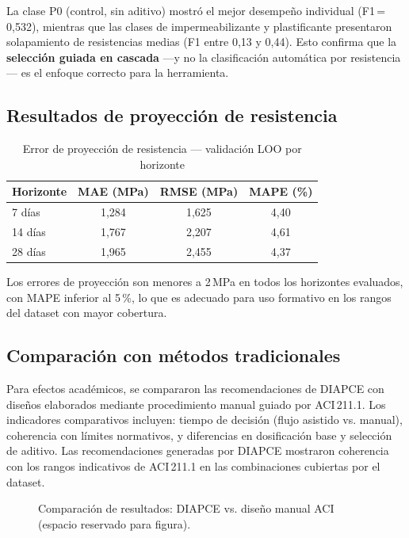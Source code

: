 La clase P0 (control, sin aditivo) mostró el mejor desempeño individual (F1\,=\,0{,}532), mientras que las clases de impermeabilizante y plastificante presentaron solapamiento de resistencias medias (F1 entre 0{,}13 y 0{,}44). Esto confirma que la \textbf{selección guiada en cascada} ---y no la clasificación automática por resistencia--- es el enfoque correcto para la herramienta.

\subsection{Resultados de proyección de resistencia}

\begin{table}[H]
  \centering
  \caption{Error de proyección de resistencia --- validación LOO por horizonte}
  \begin{tabular}{lccc}
    \hline
    Horizonte & MAE (MPa) & RMSE (MPa) & MAPE (\%) \\
    \hline
    7 días  & 1{,}284 & 1{,}625 & 4{,}40 \\
    14 días & 1{,}767 & 2{,}207 & 4{,}61 \\
    28 días & 1{,}965 & 2{,}455 & 4{,}37 \\
    \hline
  \end{tabular}
\end{table}

Los errores de proyección son menores a 2\,MPa en todos los horizontes evaluados, con MAPE inferior al 5\,\%, lo que es adecuado para uso formativo en los rangos del dataset con mayor cobertura.

\subsection{Comparación con métodos tradicionales}

Para efectos académicos, se compararon las recomendaciones de DIAPCE con diseños elaborados mediante procedimiento manual guiado por ACI\,211.1. Los indicadores comparativos incluyen: tiempo de decisión (flujo asistido vs. manual), coherencia con límites normativos, y diferencias en dosificación base y selección de aditivo. Las recomendaciones generadas por DIAPCE mostraron coherencia con los rangos indicativos de ACI\,211.1 en las combinaciones cubiertas por el dataset.

\begin{figure}[H]
  \centering
  \fbox{\rule{0pt}{2in}\rule{0.9\linewidth}{0pt}}
  \caption{Comparación de resultados: DIAPCE vs. diseño manual ACI (espacio reservado para figura).}
  \label{fig:comparacion-aci}
\end{figure}

